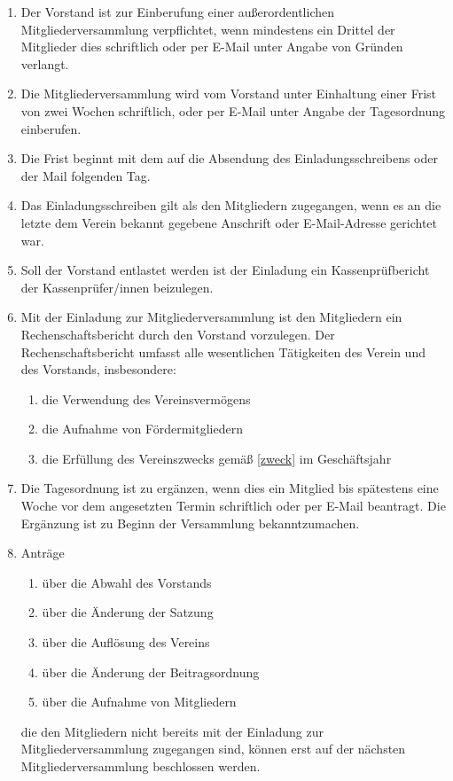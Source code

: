 \documentclass[german]{article}
\begin{document}
\begin{enumerate}
\begin{enumerate}
			\item Der Vorstand ist zur Einberufung einer außerordentlichen Mitgliederversammlung verpflichtet, wenn mindestens ein Drittel der Mitglieder dies schriftlich oder per E-Mail unter Angabe von Gründen verlangt.
			
			\item Die Mitgliederversammlung wird vom Vorstand unter Einhaltung einer Frist von zwei Wochen schriftlich, oder per E-Mail unter Angabe der Tagesordnung einberufen.
			
			\item Die Frist beginnt mit dem auf die Absendung des Einladungsschreibens oder der Mail folgenden Tag.
			
			\item Das Einladungsschreiben gilt als den Mitgliedern zugegangen, wenn es an die letzte dem Verein bekannt gegebene Anschrift oder E-Mail-Adresse gerichtet war.
			
			\item Soll der Vorstand entlastet werden ist der Einladung ein Kassenprüfbericht der Kassenprüfer/innen beizulegen.
			
			\item Mit der Einladung zur Mitgliederversammlung ist den Mitgliedern ein Rechenschaftsbericht durch den Vorstand vorzulegen.
			Der Rechenschaftsbericht umfasst alle wesentlichen Tätigkeiten des Verein und des Vorstands, insbesondere:
			\begin{enumerate}
				\item die Verwendung des Vereinsvermögens
				\item die Aufnahme von Fördermitgliedern
				\item die Erfüllung des Vereinszwecks gemäß \ref{zweck} im Geschäftsjahr
			\end{enumerate}
			
			\item Die Tagesordnung ist zu ergänzen, wenn dies ein Mitglied bis spätestens eine Woche vor dem angesetzten Termin schriftlich oder per E-Mail beantragt.
			Die Ergänzung ist zu Beginn der Versammlung bekanntzumachen.
			
			\item Anträge
			\begin{enumerate}
				\item über die Abwahl des Vorstands
				\item über die Änderung der Satzung
				\item über die Auflösung des Vereins
				\item über die Änderung der Beitragsordnung
				\item über die Aufnahme von Mitgliedern
			\end{enumerate}
			die den Mitgliedern nicht bereits mit der Einladung zur Mitgliederversammlung zugegangen sind, können erst auf der nächsten Mitgliederversammlung beschlossen werden.
			

\end{enumerate}
\end{enumerate}
\end{document}
